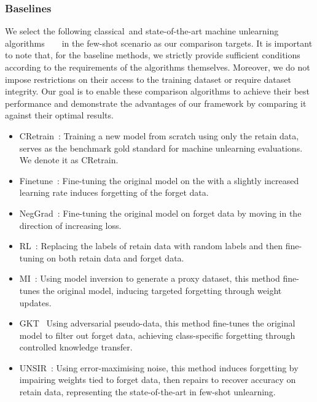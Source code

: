 \documentclass[preprint,12pt]{elsarticle}
\begin{document}
\subsubsection{Baselines}
We select the following classical~\cite{golatkar2020eternal}and state-of-the-art machine unlearning algorithms~\cite{golatkar2020eternal}~\cite{yoon2022few}~\cite{fastchundawat2023zero}~\cite{tarun2023fast}in the few-shot scenario as our comparison targets. It is important to note that, for the baseline methods, we strictly provide sufficient conditions according to the requirements of the algorithms themselves. Moreover, we do not impose restrictions on their access to the training dataset or require dataset integrity. Our goal is to enable these comparison algorithms to achieve their best performance and demonstrate the advantages of our framework by comparing it against their optimal results.
\begin{itemize}
    \item  CRetrain~\cite{nguyen2022survey}: Training a new model from scratch using only the retain data, serves as the benchmark gold standard for machine unlearning evaluations. We denote it as CRetrain.
    \item  Finetune~\cite{golatkar2020eternal}: Fine-tuning the original model on the  with a slightly increased learning rate induces forgetting of the forget data.
    \item  NegGrad~\cite{golatkar2020eternal}: Fine-tuning the original model on forget data by moving in the direction of increasing loss.
    \item  RL~\cite{golatkar2020eternal}: Replacing the labels of retain data with random labels and then ﬁne-tuning on both retain data and  forget data.
    \item  MI~\cite{yoon2022few}: Using model inversion to generate a proxy dataset, this method fine-tunes the original model, inducing targeted forgetting through weight updates.
    \item  GKT~\cite{fastchundawat2023zero} Using adversarial pseudo-data, this method fine-tunes the original model to filter out forget data, achieving class-specific forgetting through controlled knowledge transfer. 
    \item  UNSIR~\cite{tarun2023fast}: Using error-maximising noise, this method induces forgetting by impairing weights tied to forget data, then repairs to recover accuracy on retain data, representing the state-of-the-art in few-shot unlearning.
\end{itemize}
\end{document}
